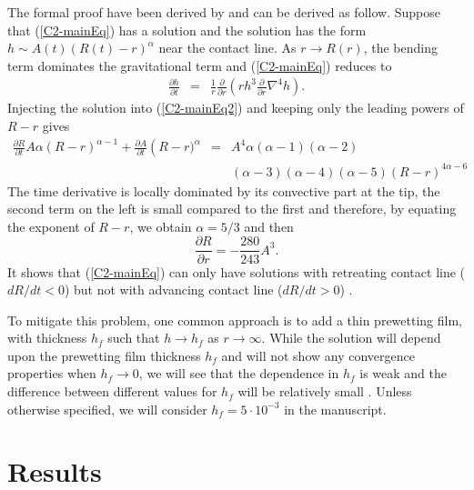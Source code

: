 The formal proof  have been derived by  \citet{Flitton:1999iv} and can
be derived  as follow. Suppose  that (\ref{C2-mainEq}) has  a solution
and the solution has the  form $h \sim A(t)(R(t)-r)^{\alpha}$ near the
contact line.  As $r \rightarrow R(r)$, the bending term dominates the
gravitational term and (\ref{C2-mainEq}) reduces to
\begin{eqnarray}
  \frac{\partial       h}{\partial       t}&      =&\frac{1}{       r}
                                                     \frac{\partial}{\partial r}\left( rh^3 \frac{\partial}{\partial r}\nabla^4h\right).
                                                     \label{C2-mainEq2}
\end{eqnarray}
Injecting the  solution into  (\ref{C2-mainEq2}) and keeping  only the
leading powers of $R-r$ gives
\begin{eqnarray}
  \frac{\partial    R}{\partial    t}    A\alpha\left(R-r\right)^{\alpha-1}+
  \frac{\partial           A}{\partial           t}\left(R-r)^{\alpha}
  &=&A^4\alpha(\alpha-1)(\alpha-2)\nonumber\\
  &&(\alpha-3)(\alpha-4)(\alpha-5)(R-r)^{4\alpha-6}\nonumber
\end{eqnarray}
The time derivative is locally dominated by its convective part at the
tip, the second  term on the left  is small compared to  the first and
therefore, by equating the exponent of $R-r$, we obtain $\alpha = 5/3$
and then
\begin{equation}
  \frac{\partial R}{\partial r} =-\frac{280}{243} A^3.
\end{equation}
It  shows   that  (\ref{C2-mainEq})  can  only   have  solutions  with
retreating  contact line  ($dR/dt<0$) but  not with  advancing contact
line ($dR/dt>0$) \citep{Lister:2013ia,Flitton:1999iv}.

To  mitigate this  problem,  one  common approach  is  to  add a  thin
prewetting film, with thickness $h_f$  such that $h\rightarrow h_f$ as
$r\rightarrow  \infty$.   While  the  solution will  depend  upon  the
prewetting  film thickness  $h_f$ and  will not  show any  convergence
properties when $h_f\rightarrow 0$, we will see that the dependence in
$h_f$ is  weak and the  difference between different values  for $h_f$
will  be  relatively  small  \citep{Lister:2013ia,Anonymous:QWXp_4JV}.
Unless otherwise specified, we will consider $h_f = 5\cdot 10^{-3}$ in
the manuscript.



\section{Results}
\label{C2-sec:regime-propagations}

